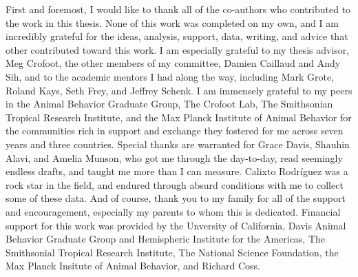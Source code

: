 \documentclass[twoside,12pt,final]{ucthesis-CA2012}
\begin{document}
\begin{ucfrontmatter}
\begin{dedication}
\begin{center}
\begin{large}
      \end{large}
      \end{center}
  \end{dedication}
\begin{acknowledgements}
    First and foremost, I would like to thank all of the co-authors who contributed to the work in this thesis. None of this work was completed on my own, and I am incredibly grateful for the ideas, analysis, support, data, writing, and advice that other contributed toward this work. I am especially grateful to my thesis advisor, Meg Crofoot, the other members of my committee, Damien Caillaud and Andy Sih, and to the academic mentors I had along the way, including Mark Grote, Roland Kays, Seth Frey, and Jeffrey Schenk. I am immensely grateful to my peers in the Animal Behavior Graduate Group, The Crofoot Lab, The Smithsonian Tropical Research Institute, and the Max Planck Institute of Animal Behavior for the communities rich in support and exchange they fostered for me across seven years and three countries. Special thanks are warranted for Grace Davis, Shauhin Alavi, and Amelia Munson, who got me through the day-to-day, read seemingly endless drafts, and taught me more than I can measure. Calixto Rodríguez was a rock star in the field, and endured through absurd conditions with me to collect some of these data. And of course, thank you to my family for all of the support and encouragement, especially my parents to whom this is dedicated. Financial support for this work was provided by the Unversity of California, Davis Animal Behavior Graduate Group and Hemispheric Institute for the Americas, The Smithsonial Tropical Research Institute, The National Science Foundation, the Max Planck Insitute of Animal Behavior, and Richard Coss.
  \end{acknowledgements}
% 

\end{ucfrontmatter}
\end{document}
